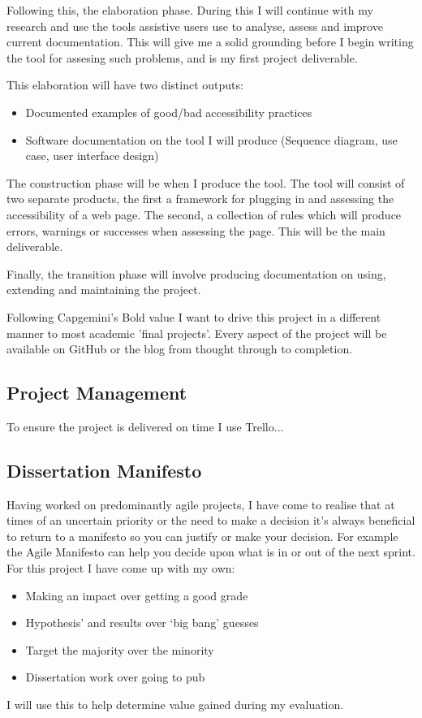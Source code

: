 Following this, the elaboration phase. During this I will continue with my research and use the tools assistive users use to analyse,
assess and improve current documentation. This will give me a solid grounding before I begin writing the tool for assesing such problems,
 and is my first project deliverable.

This elaboration will have two distinct outputs:
\begin{itemize}
  \item Documented examples of good/bad accessibility practices
  \item Software documentation on the tool I will produce (Sequence diagram, use case, user interface design)
\end{itemize}

The construction phase will be when I produce the tool. The tool will consist of two separate products, the first a framework for plugging
in and assessing the accessibility of a web page. The second, a collection of rules which will produce errors, warnings or successes when
assessing the page. This will be the main deliverable.

Finally, the transition phase will involve producing documentation on using, extending and maintaining the project.

Following Capgemini's Bold value I want to drive this project in a different manner to most academic 'final projects'. Every aspect of the
project will be available on GitHub or the blog from thought through to completion.

\subsection{Project Management}
To ensure the project is delivered on time I use Trello...

\subsection{Dissertation Manifesto}
Having worked on predominantly agile projects, I have come to realise that at times of an uncertain priority or the need to make a decision
it’s always beneficial to return to a manifesto so you can justify or make your decision. For example the Agile Manifesto can help you
decide upon what is in or out of the next sprint. For this project I have come up with my own:
\begin{itemize}
  \item Making an impact over getting a good grade
  \item Hypothesis’ and results over ‘big bang’ guesses
  \item Target the majority over the minority
  \item Dissertation work over going to pub
\end{itemize}
I will use this to help determine value gained during my evaluation.

